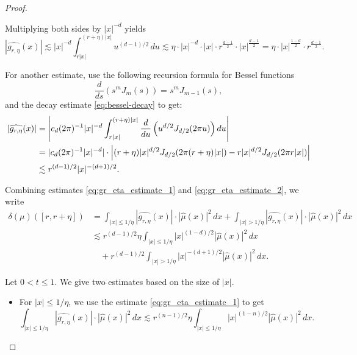 \documentclass[12pt,a4paper]{report}
\theoremstyle{definition}
\begin{document}
\begin{proof}
\begin{itemize}
Multiplying both sides by \( |x|^{-d} \) yields
\begin{equation} \label{eq:gr_eta_estimate_1}
|\widehat{g_{r,\eta}}(x)|
\lesssim |x|^{-d} \int_{r|x|}^{(r + \eta)|x|} u^{(d-1)/2} \, du
\lesssim \eta \cdot |x|^{-d} \cdot |x| \cdot r^{\frac{d-1}{2}} \cdot |x|^{\frac{d-1}{2}}
= \eta \cdot |x|^{\frac{1 - d}{2}} \cdot r^{\frac{d-1}{2}}.
\end{equation}


For another estimate, use the following recursion formula for Bessel functions
$$
\frac{d}{ds} \left( s^m J_m(s) \right) = s^m J_{m-1}(s),
\label{recurBessel}
$$
and the decay estimate \eqref{eq:bessel-decay} to get:
\begin{align}
|\widehat{g_{r,\eta}}(x)|
&= \left| c_d (2\pi)^{-1} |x|^{-d} \int_{r|x|}^{(r+\eta)|x|} \frac{d}{du} \left( u^{d/2} J_{d/2}(2\pi u) \right) du \right| \notag \\
&= |c_d (2\pi)^{-1} |x|^{-d}| \cdot \left| (r + \eta) |x|^{d/2} J_{d/2}(2\pi(r + \eta)|x|)
- r |x|^{d/2} J_{d/2}(2\pi r |x|) \right| \notag \\
&\lesssim r^{(d-1)/2} |x|^{-(d+1)/2}.
\label{eq:gr_eta_estimate_2}
\end{align}

Combining estimates \eqref{eq:gr_eta_estimate_1} and \eqref{eq:gr_eta_estimate_2}, we write
\begin{align*}
\delta(\mu)([r, r + \eta])
&= \int_{|x| \leq 1/\eta} |\widehat{g_{r,\eta}}(x)| \cdot |\widehat{\mu}(x)|^2 \, dx
+ \int_{|x| > 1/\eta} |\widehat{g_{r,\eta}}(x)| \cdot |\widehat{\mu}(x)|^2 \, dx \\
&\lesssim r^{(d-1)/2} \eta \int_{|x| \leq 1/\eta} |x|^{(1-d)/2} |\widehat{\mu}(x)|^2 \, dx \\
&\quad + r^{(d-1)/2} \int_{|x| > 1/\eta} |x|^{-(d+1)/2} |\widehat{\mu}(x)|^2 \, dx.
\end{align*}

Let \( 0 < t \leq 1 \). We give two estimates based on the size of \( |x| \).

\begin{itemize}
\item For \( |x| \le 1/\eta \), we use the estimate \eqref{eq:gr_eta_estimate_1} to get  \begin{equation}
  \int_{|x| \le 1/\eta} |\widehat{g_{r,\eta}}(x)| \cdot |\widehat{\mu}(x)|^2 \, dx
  \lesssim r^{(n-1)/2} \eta \int_{|x| \le 1/\eta} |x|^{(1-n)/2} |\widehat{\mu}(x)|^2 \, dx.
  \label{eq:gr_eta_integral_small_x}
  \end{equation}


\end{itemize}
\end{itemize}
\end{proof}
\end{document}
